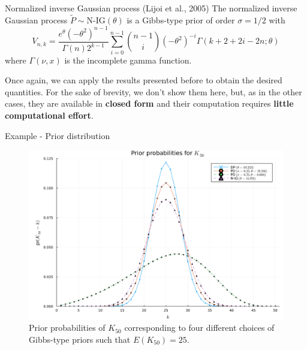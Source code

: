 \documentclass[11pt, handout]{beamer}
\begin{document}
\begin{frame}{Normalized inverse Gaussian process (Lijoi et al., 2005)}
    The normalized inverse Gaussian process \(\tilde{P} \sim \text{N-IG}(\theta)\) is a Gibbs-type prior of order \(\sigma = 1/2\) with
    \begin{equation*}
        V_{n,k} = \frac{e^{\theta}(-\theta^2)^{n-1}}{\Gamma(n)2^{k-1}} \sum_{i=0}^{n-1}\binom{n-1}{i}(-\theta^2)^{-i}\Gamma(k+2+2i-2n; \theta)
    \end{equation*}
    where \(\Gamma(\nu, x)\) is the incomplete gamma function.
    \medskip
    
    Once again, we can apply the results presented before to obtain the desired quantities. For the sake of brevity, we don't show them here, but, as in the other cases, they are available in \textbf{closed form} and their computation requires \textbf{little computational effort}.
\end{frame}

\begin{frame}{Example - Prior distribution}
    \begin{figure}
        \includegraphics[scale=0.1]{../img/prior_probability.png}
        \caption{Prior probabilities of \(K_{50}\) corresponding to four different choices of Gibbs-type priors such that \(E(K_{50}) = 25\).}
        \label{fig:prior}
    \end{figure}
\end{frame}
\end{document}
